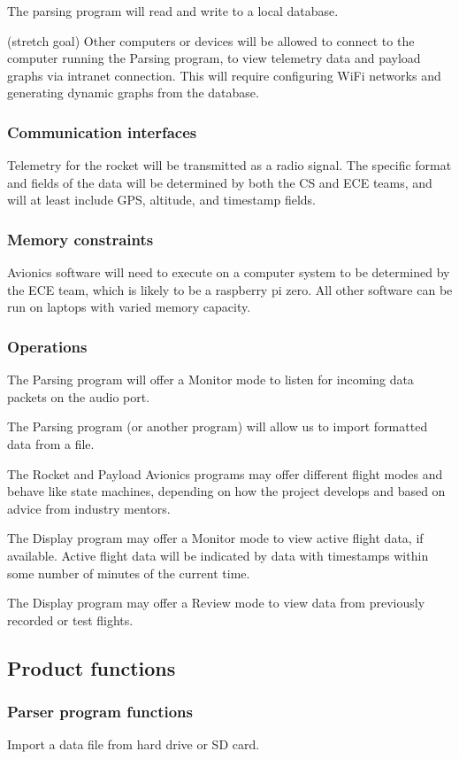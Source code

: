 \documentclass[onecolumn, draftclsnofoot, 10pt, compsoc]{IEEEtran}
\begin{document}
The parsing program will read and write to a local database.

(stretch goal) Other computers or devices will be allowed to connect to the computer running the Parsing program, to view telemetry data and payload graphs via intranet connection.  This will require configuring WiFi networks and generating dynamic graphs from the database.

\subsubsection{Communication interfaces}
Telemetry for the rocket will be transmitted as a radio signal.  The specific format and fields of the data will be determined by both the CS and ECE teams, and will at least include GPS, altitude, and timestamp fields.

\subsubsection{Memory constraints}
Avionics software will need to execute on a computer system to be determined by the ECE team, which is likely to be a raspberry pi zero. All other software can be run on laptops with varied memory capacity.

\subsubsection{Operations}
The Parsing program will offer a Monitor mode to listen for incoming data packets on the audio port.

The Parsing program (or another program) will allow us to import formatted data from a file.

The Rocket and Payload Avionics programs may offer different flight modes and behave like state machines, depending on how the project develops and based on advice from industry mentors.

The Display program may offer a Monitor mode to view active flight data, if available.  Active flight data will be indicated by data with timestamps within some number of minutes of the current time.

The Display program may offer a Review mode to view data from previously recorded or test flights.

\subsection{Product functions}
\subsubsection{Parser program functions}
Import a data file from hard drive or SD card.
\end{document}
